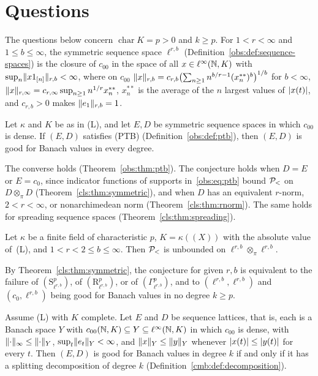 \section{Questions}\label{sec:questions}

The questions below concern $\operatorname{char}K=p>0$ and $k\ge p$. For $1<r<\infty$ and $1\le b\le\infty$, the
symmetric sequence space $\ell^{r,b}$ (Definition~\ref{obs:def:sequence-spaces}) is the closure of $c_{00}$ in the space
of all $x\in\ell^\infty(\mathbb N,K)$ with $\sup_n\lVert x1_{[n]}\rVert_{r,b}<\infty$, where on $c_{00}$
$\lVert x\rVert_{r,b}=c_{r,b}\bigl(\sum_{n\ge1}n^{b/r-1}(x^{**}_n)^b\bigr)^{1/b}$ for $b<\infty$,
$\lVert x\rVert_{r,\infty}=c_{r,\infty}\sup_{n\ge1}n^{1/r}x^{**}_n$, $x^{**}_n$ is the average of the $n$ largest values of
$\lvert x(t)\rvert$, and $c_{r,b}>0$ makes $\lVert e_1\rVert_{r,b}=1$.

\begin{conjecture}\label{q:conj:pt}
Let $\kappa$ and $K$ be as in \textup{(L)}, and let $E,D$ be symmetric sequence spaces in which $c_{00}$ is dense. If $(E,D)$
satisfies \textup{(PTB)} (Definition~\ref{obs:def:ptb}), then $(E,D)$ is good for Banach values in every degree.
\end{conjecture}

The converse holds (Theorem~\ref{obs:thm:ptb}). The conjecture holds when $D=E$ or $E=c_0$, since indicator functions of
supports in~\eqref{obs:eq:ptb} bound $\mathcal P_<$ on $D\otimes_\pi D$ (Theorem~\ref{cls:thm:symmetric}), and when $D$ has an
equivalent $r$\nobreakdash-norm, $2<r<\infty$, or nonarchimedean norm (Theorem~\ref{cls:thm:rnorm}). The same holds for
spreading sequence spaces (Theorem~\ref{cls:thm:spreading}).

\begin{conjecture}\label{q:conj:g}
Let $\kappa$ be a finite field of characteristic $p$, $K=\kappa((X))$ with the absolute value of~\textup{(L)}, and $1<r<2\le b\le\infty$. Then $\mathcal P_<$ is unbounded on
$\ell^{r,b}\otimes_\pi\ell^{r,b}$.
\end{conjecture}

By Theorem~\ref{cls:thm:symmetric}, the conjecture for given $r,b$ is equivalent to the failure of
$(\mathrm S^p_{\ell^{r,b}})$, of $(\mathrm R^p_{\ell^{r,b}})$, or of $(\Gamma^p_{\ell^{r,b}})$, and to $(\ell^{r,b},\ell^{r,b})$
and $(c_0,\ell^{r,b})$ being good for Banach values in no degree $k\ge p$.

\begin{conjecture}\label{q:conj:lattice}
Assume \textup{(L)} with $K$ complete. Let $E$ and $D$ be sequence lattices, that is, each is a Banach space $Y$ with
$c_{00}(\mathbb N,K)\subseteq Y\subseteq\ell^\infty(\mathbb N,K)$ in which $c_{00}$ is dense, with $\lVert \cdot\rVert_\infty\le\lVert \cdot\rVert_Y$,
$\sup_t\lVert e_t\rVert_Y<\infty$, and $\lVert x\rVert_Y\le\lVert y\rVert_Y$ whenever $\lvert x(t)\rvert\le\lvert y(t)\rvert$ for every $t$. Then $(E,D)$ is good for Banach values in
degree $k$ if and only if it has a splitting decomposition of degree $k$ (Definition~\ref{cmb:def:decomposition}).
\end{conjecture}

